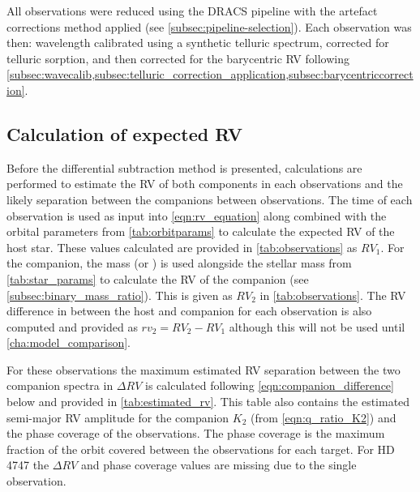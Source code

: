 \begin{landscape}
    
\end{landscape}

All observations were reduced using the {DRACS} pipeline with the artefact corrections method applied (see \cref{subsec:pipeline-selection}).
Each observation was then: wavelength calibrated using a synthetic telluric spectrum, corrected for telluric sorption, and then corrected for the barycentric RV following  \cref{subsec:wavecalib,subsec:telluric_correction_application,subsec:barycentriccorrection}.


\subsection{Calculation of expected RV}

Before the differential subtraction method is presented, calculations are performed to estimate the RV of both components in each observations and the likely separation between the companions between observations.
The time of each observation is used as input into \cref{eqn:rv_equation} along combined with the orbital parameters from \cref{tab:orbitparams} to calculate the expected RV of the host star.
These values calculated are provided in \cref{tab:observations} as \({RV}_{1}\).
For the companion, the mass (\Mtwo or \Mtwosini{}) is used alongside the stellar mass from \cref{tab:star_params} to calculate the RV of the companion (see \cref{subsec:binary_mass_ratio}).
This is given as \({RV}_{2}\) in \cref{tab:observations}.
The RV difference in between the host and companion for each observation is also computed and provided as \({rv}_{2} = {RV}_{2}-{RV}_{1}\) although this will not be used until \cref{cha:model_comparison}.

For these observations the maximum estimated RV separation between the two companion spectra in \(\Delta RV\) is calculated following \cref{eqn:companion_difference} below and provided in \cref{tab:estimated_rv}.
This table also contains the estimated semi-major RV amplitude for the companion \(K_2\) (from \cref{eqn:q_ratio_K2}) and the phase coverage of the observations.
The phase coverage is the maximum fraction of the orbit covered between the observations for each target.
For {HD\,4747} the \(\Delta RV\) and phase coverage values are missing due to the single observation.




